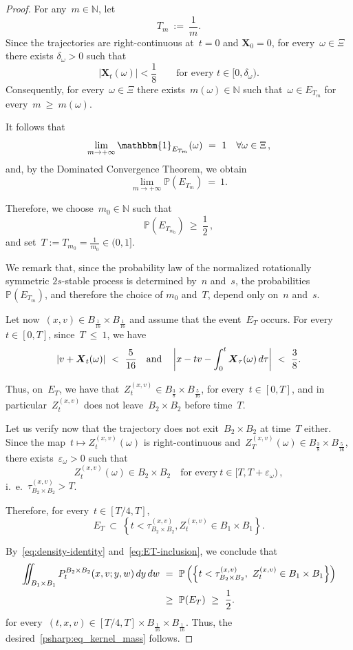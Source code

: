 \documentclass[leqno,10pt]{amsart}
\theoremstyle{plain}
\theoremstyle{remark}
\numberwithin{equation}{section}
\def \d{\,{\rm d}}
\def\en{\mathbb{N}}
\newcommand{\Xb}{\boldsymbol{X}}
\begin{document}
{\begin{proof}
For any~$m \in \en$, let
\[
T_m \ := \ \frac{1}{m}.
\]
Since the trajectories are right-continuous at~$t=0$ and
$\Xb_0=0$, for every~$\omega\in\Xi$ there exists
$\delta_\omega>0$ such that
\[
|\Xb_t(\omega)|<\frac18
\qquad
\text{for every }t\in[0,\delta_\omega).
\]
Consequently, for every~$\omega\in\Xi$ there exists~$m(\omega)\in\mathbb{N}$ such that~$
\omega\in E_{T_m}$ for every~$m\ \geq\  m(\omega)$.

It follows that
\[
\lim_{m\to +\infty}\mathbbm{1}_{E_{T_m}}(\omega)
\ = \ 1 \quad \forall \omega \in \Xi\,,
\]
and, by the Dominated Convergence Theorem, we obtain
\[
\lim_{m\to+\infty}\mathbb{P}(E_{T_m})
\ = \ 1.
\]

Therefore, we choose~$m_0\in\mathbb{N}$ such that
\[
\mathbb{P}(E_{T_{m_0}})\ \geq\ \frac{1}{2}\,,
\]
and set~$T  :=  T_{m_0}  =  \frac1{m_0} \in (0,1]$.

We remark that, since the probability law of the normalized rotationally symmetric
$2s$-stable process is determined by~$n$ and~$s$, the
probabilities~$\mathbb{P}(E_{T_m})$, and therefore the choice of
$m_0$ and~$T$, depend only on~$n$ and~$s$.


Let now~$(x,v)\in B_{\frac{1}{16}}\times B_{\frac{1}{16}}$ 
and assume that the event~$E_T$ occurs. For every~$t\in[0,T]$, since~$T\ \leq\ 1$, we have 
\[
|v+\Xb_t(\omega)| 
\ < \ \frac{5}{16} \quad \text{and} \quad 
\left|x-tv-\int_0^t\Xb_\tau(\omega)\d\tau\right| \ <\ \frac{3}{8}. 
\]

Thus, on~$E_T$, we have that~$Z_t^{(x,v)}\in B_{\frac{3}{8}}\times B_{\frac{5}{16}}$, for every~$t \in [0,T]$, and in particular~$Z_t^{(x,v)}$ does not leave~$B_2\times B_2$ before time~$T$. 

Let us verify now that the trajectory does not exit~$B_2\times B_2$ at time~$T$ either. Since the map~$t \mapsto Z_t^{(x,v)}(\omega)$ is right-continuous and~$Z_T^{(x,v)}(\omega) \in B_{\frac38}\times B_{\frac5{16}}$, there exists~$\varepsilon_\omega>0$ such that
\[
Z_t^{(x,v)}(\omega)\in B_2\times B_2
\quad \text{for every}~t\in[T,T+\varepsilon_\omega)\,,
\]
i.~\!e.~$\tau_{B_2\times B_2}^{(x,v)}>T$.

Therefore, for every~$t\in[T/4,T]$,
\begin{equation}\label{eq:ET-inclusion}
E_T \ \subset \ \left\{t<\tau_{B_2\times B_2}^{(x,v)}, Z_t^{(x,v)}\in B_1\times B_1 \right\}.
\end{equation}

By~\eqref{eq:density-identity} and~\eqref{eq:ET-inclusion}, we conclude
that
\[ 
\begin{aligned}
\iint_{B_1\times B_1}P_t^{B_2\times B_2}(x,v;y,w)\d y\d w & \ = \ \mathbb{P}\left(\left\{t<\tau_{B_2\times B_2}^{(x,v)},\ Z_t^{(x,v)}\in B_1\times B_1\right\}\right) \\
& \ \geq\ \mathbb{P}(E_T) \ \geq\ \frac{1}{2}. 
\end{aligned}
\]
for every~$(t,x,v)\in[T/4,T]\times B_{\frac{1}{16}}\times B_{\frac{1}{16}}$. Thus, the desired~\eqref{psharp:eq_kernel_mass} follows.
\end{proof}




}
\end{document}
